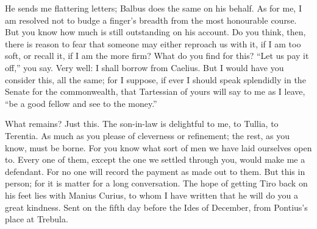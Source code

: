  He sends me flattering letters; Balbus does the same on his behalf. As for me, I am resolved not to budge a finger's breadth from the most honourable course. But you know how much is still outstanding on his account. Do you think, then, there is reason to fear that someone may either reproach us with it, if I am too soft, or recall it, if I am the more firm? What do you find for this? ``Let us pay it off,'' you say. Very well: I shall borrow from Caelius. But I would have you consider this, all the same; for I suppose, if ever I should speak splendidly in the Senate for the commonwealth, that Tartessian of yours will say to me as I leave, ``be a good fellow and see to the money.''

 What remains? Just this. The son-in-law is delightful to me, to Tullia, to Terentia. As much as you please of cleverness or refinement; the rest, as you know, must be borne. For you know what sort of men we have laid ourselves open to. Every one of them, except the one we settled through you, would make me a defendant. For no one will record the payment as made out to them. But this in person; for it is matter for a long conversation. The hope of getting Tiro back on his feet lies with Manius Curius, to whom I have written that he will do you a great kindness. Sent on the fifth day before the Ides of December, from Pontius's place at Trebula.




